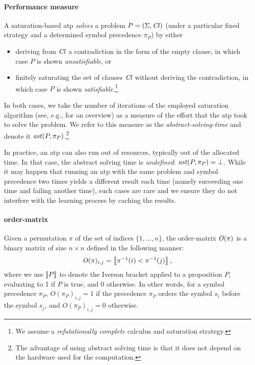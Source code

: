 \documentclass{ceurart}
\begin{document}
\paragraph{Performance measure} A saturation-based \gls*{atp} \emph{solves} a problem \(P = (\operatorname{\Sigma},\operatorname{\mathit{Cl}})\)
(under a particular fixed strategy and a determined symbol precedence \(\pi_P\))  by either
\begin{itemize}
\item
	deriving from \(\operatorname{\mathit{Cl}}\) a contradiction in the form of the empty clause,
	in which case \(P\) is shown \emph{unsatisfiable}, or
\item
	finitely saturating the set of clauses \(\operatorname{\mathit{Cl}}\) without deriving the contradiction,
	in which case \(P\) is shown \emph{satisfiable}.\footnote{We assume a \emph{refutationally complete} calculus and saturation strategy.}	
\end{itemize}
In both cases, we take the number of iterations of the employed saturation algorithm (see, e.g., \citet{DBLP:journals/jsc/RiazanovV03} for an overview) 
as a measure of the effort that the \gls*{atp} took to solve the problem.
We refer to this measure as the \emph{\gls*{abstract-solving-time}} and denote it \(\operatorname{\mathit{ast}}(P,\pi_P)\).\footnote{The advantage of using abstract solving time is that it does not depend on the hardware used for the computation.}

In practice, an \gls*{atp} can also run out of resources, typically out of the allocated time.
In that case, the abstract solving time is \emph{undefined}: \(\operatorname{\mathit{ast}}(P,\pi_P) = \bot\).
%
While it may happen that running an \gls*{atp} with the same problem and symbol precedence two times
yields a different result each time (namely succeeding one time and failing another time),
such cases are rare and we ensure they do not interfere with the learning process by caching the results.


\paragraph{\Gls*{order-matrix}}
Given a permutation \(\pi\) of the set of indices \(\{1,\ldots,n\}\),
the \gls*{order-matrix} \(\operatorname{\mathit{O}}(\pi)\) is a binary matrix of size \(n \times n\)
defined in the following manner:
\begin{align*}
\operatorname{\mathit{O}}(\pi)_{i, j} = \left \llbracket \pi^{-1}(i) < \pi^{-1}(j) \right \rrbracket,
\end{align*}
where we use \(\left \llbracket P \right \rrbracket\) to denote the Iverson bracket \cite{Iverson1962} applied to a proposition \(P\),
evaluating to 1 if \(P\) is true, and 0 otherwise.
In other words, for a symbol precedence \(\pi_P\), \(O(\pi_P)_{i, j} = 1\) if
the precedence \(\pi_P\) orders the symbol \(s_i\) before the symbol \(s_j\),
and \(O(\pi_P)_{i, j} = 0\) otherwise.
\end{document}
